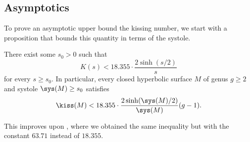 \documentclass[12pt]{amsart}
\numberwithin{equation}{section}
\begin{document}
\subsection{Asymptotics}


To prove an asymptotic upper bound the kissing number, we start with a proposition that bounds this quantity in terms of the systole.

\begin{prop}  \label{prop:kiss_sys}
There exist some $s_0>0$ such that
\[
K(s) <  18.355 \cdot \frac{2\sinh(s/2)}{s}
\]
for every $s \geq s_0$. In particular, every closed hyperbolic surface $M$ of genus $g\geq 2$ and systole $\sys(M)\geq s_0$ satisfies
\[
\kiss(M) < 18.355 \cdot \frac{2\sinh(\sys(M)/2)}{\sys(M)} (g-1).
\]
\end{prop}

\begin{rem}
This improves upon \cite[Remark 4.4]{KissingManifolds}, where we obtained the same inequality but with the constant $63.71$ instead of $18.355$.
\end{rem}
\end{document}
